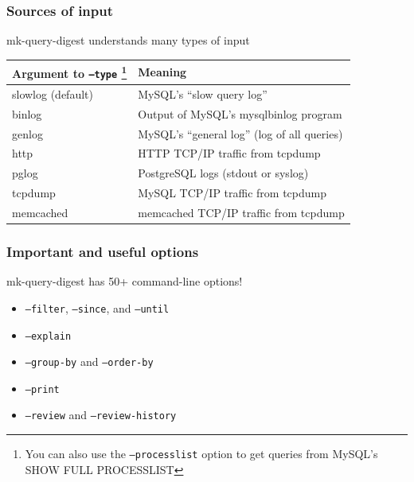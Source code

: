 \begin{frame}
   \frametitle{Sources of input}
   \begin{block}{mk-query-digest understands many types of input}
   \begin{center}
   \begin{tabular}{ll}
   Argument to \texttt{--type}
      \footnote{You can also use the \texttt{--processlist} option to get queries from MySQL's SHOW FULL PROCESSLIST}
   & Meaning \\
   \hline
   slowlog (default) & MySQL's ``slow query log'' \\
   binlog & Output of MySQL's mysqlbinlog program \\
   genlog & MySQL's ``general log'' (log of all queries) \\
   http   & HTTP TCP/IP traffic from tcpdump \\
   pglog  & PostgreSQL logs (stdout or syslog) \\
   tcpdump & MySQL TCP/IP traffic from tcpdump \\
   memcached & memcached TCP/IP traffic from tcpdump \\
   \end{tabular}
   \end{center}
   \end{block}
\end{frame}

\begin{frame}
   \frametitle{Important and useful options}
   \begin{block}{mk-query-digest has 50+ command-line options!}
   \begin{itemize}
      \item \texttt{--filter}, \texttt{--since}, and \texttt{--until}
      \item \texttt{--explain}
      \item \texttt{--group-by} and \texttt{--order-by}
      \item \texttt{--print}
      \item \texttt{--review} and \texttt{--review-history}
   \end{itemize}
   \end{block}
\end{frame}

